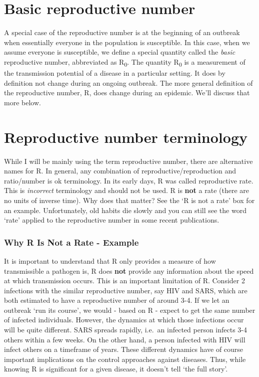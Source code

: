 \documentclass[]{book}
\theoremstyle{definition}
\theoremstyle{definition}
\theoremstyle{definition}
\theoremstyle{remark}
\begin{document}
\section{Basic reproductive number}\label{basic-reproductive-number}

A special case of the reproductive number is at the beginning of an
outbreak when essentially everyone in the population is susceptible. In
this case, when we assume everyone is susceptible, we define a special
quantity called the \emph{basic} reproductive number, abbreviated as
R\textsubscript{0}. The quantity R\textsubscript{0} is a measurement of
the transmission potential of a disease in a particular setting. It does
by definition not change during an ongoing outbreak. The more general
definition of the reproductive number, R, does change during an
epidemic. We'll discuss that more below.

\section{Reproductive number
terminology}\label{reproductive-number-terminology}

While I will be mainly using the term reproductive number, there are
alternative names for R. In general, any combination of
reproductive/reproduction and ratio/number is ok terminology. In its
early days, R was called reproductive rate. This is \emph{incorrect}
terminology and should not be used. R is \textbf{not} a rate (there are
no units of inverse time). Why does that matter? See the `R is not a
rate' box for an example. Unfortunately, old habits die slowly and you
can still see the word `rate' applied to the reproductive number in some
recent publications.

\subsubsection{Why R Is Not a Rate - Example}\label{myexamplebox}

It is important to understand that R only provides a measure of how
transmissible a pathogen is, R does \textbf{not} provide any information
about the speed at which transmission occurs. This is an important
limitation of R. Consider 2 infections with the similar reproductive
number, say HIV and SARS, which are both estimated to have a
reproductive number of around 3-4. If we let an outbreak `run its
course', we would - based on R - expect to get the same number of
infected individuals. However, the dynamics at which those infections
occur will be quite different. SARS spreads rapidly, i.e.~an infected
person infects 3-4 others within a few weeks. On the other hand, a
person infected with HIV will infect others on a timeframe of years.
These different dynamics have of course important implications on the
control approaches against diseases. Thus, while knowing R is
significant for a given disease, it doesn't tell `the full story'.
\end{document}
